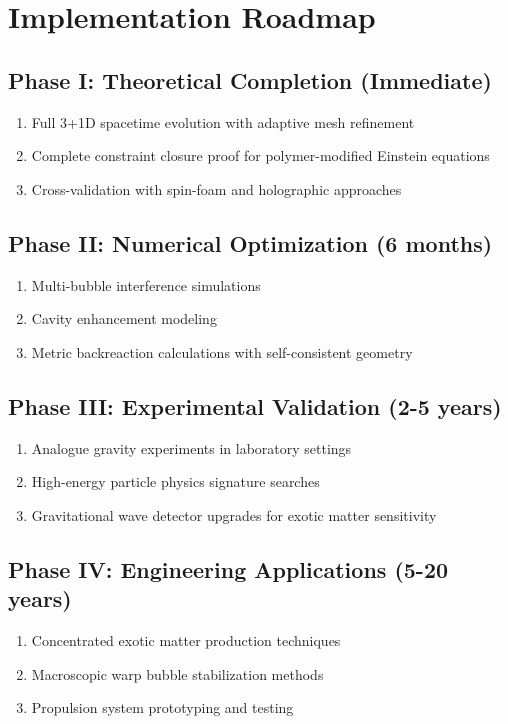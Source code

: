 \documentclass[11pt]{article}
\begin{document}
\section{Implementation Roadmap}

\subsection{Phase I: Theoretical Completion (Immediate)}
\begin{enumerate}
  \item Full 3+1D spacetime evolution with adaptive mesh refinement
  \item Complete constraint closure proof for polymer-modified Einstein equations
  \item Cross-validation with spin-foam and holographic approaches
\end{enumerate}

\subsection{Phase II: Numerical Optimization (6 months)}
\begin{enumerate}
  \item Multi-bubble interference simulations
  \item Cavity enhancement modeling
  \item Metric backreaction calculations with self-consistent geometry
\end{enumerate}

\subsection{Phase III: Experimental Validation (2-5 years)}
\begin{enumerate}
  \item Analogue gravity experiments in laboratory settings
  \item High-energy particle physics signature searches
  \item Gravitational wave detector upgrades for exotic matter sensitivity
\end{enumerate}

\subsection{Phase IV: Engineering Applications (5-20 years)}
\begin{enumerate}
  \item Concentrated exotic matter production techniques
  \item Macroscopic warp bubble stabilization methods
  \item Propulsion system prototyping and testing
\end{enumerate}
\end{document}
